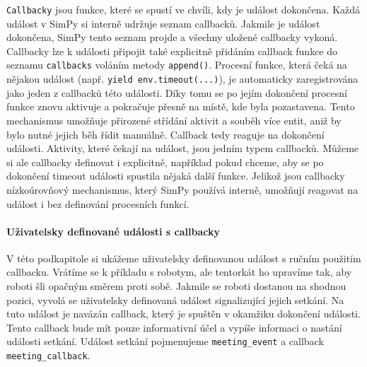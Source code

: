 \documentclass[
  program=itp,
  biblatex,
  figures=false,
  glossaries,
  index
]{kidiplom}
\begin{document}
\texttt{Callbacky} jsou funkce, které se spustí ve chvíli, kdy je událost dokončena. Každá událost v SimPy si interně udržuje seznam callbacků. Jakmile je událost dokončena, SimPy tento seznam projde a všechny uložené callbacky vykoná. Callbacky lze k události připojit také explicitně přidáním callback funkce do seznamu \texttt{callbacks} voláním metody \texttt{append()}. Procesní funkce, která čeká na nějakou událost (např. \texttt{yield env.timeout(...)}), je automaticky zaregistrována jako jeden z callbacků této události. Díky tomu se po jejím dokončení procesní funkce znovu aktivuje a pokračuje přesně na místě, kde byla pozastavena. Tento mechanismus umožňuje přirozené střídání aktivit a souběh více entit, aniž by bylo nutné jejich běh řídit manuálně. Callback tedy reaguje na dokončení události. Aktivity, které čekají na událost, jsou jedním typem callbacků. Můžeme si ale callbacky definovat i explicitně, například pokud chceme, aby se po dokončení timeout události spustila nějaká další funkce. Jelikož jsou callbacky nízkoúrovňový mechanismus, který SimPy používá interně, umožňují reagovat na událost i bez definování procesních funkcí.

\paragraph{Uživatelsky definované události s callbacky}
V této podkapitole si ukážeme uživatelsky definovanou událost s ručním použitím callbacku. Vrátíme se k příkladu s robotym, ale tentorkát ho upravíme tak, aby roboti šli opačným směrem proti sobě. Jakmile se roboti dostanou na shodnou pozici, vyvolá se uživatelsky definovaná událost signalizující jejich setkání. Na tuto událost je navázán callback, který je spuštěn v okamžiku dokončení události. Tento callback bude mít pouze informativní účel a vypíše informaci o nastání události setkání. Událost setkání pojmenujeme \texttt{meeting\_event} a callback \texttt{meeting\_callback}. 
\end{document}

